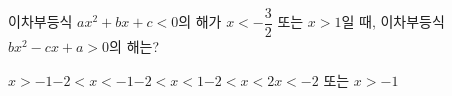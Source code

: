 이차부등식 $ax^2+bx+c<0$의 해가 $x<-\dfrac{3}{2}$ 또는 $x>1$일 때, 이차부등식 $bx^2-cx+a>0$의 해는? 
\begin{choicesii}{$x>-1$}{$-2<x<-1$}{$-2<x<1$}{$-2<x<2$}{$x<-2$ 또는 $x>-1$}\end{choicesii}
